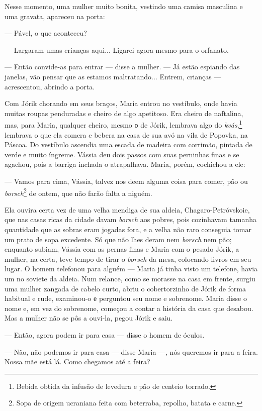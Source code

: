 Nesse momento, uma mulher muito bonita, vestindo uma camisa masculina e
uma gravata, apareceu na porta:

--- Pável, o que aconteceu?

--- Largaram umas crianças aqui... Ligarei agora mesmo para o orfanato.

--- Então convide-as para entrar --- disse a mulher. --- Já estão
espiando das janelas, vão pensar que as estamos maltratando... Entrem,
crianças --- acrescentou, abrindo a porta.

Com Jórik chorando em seus braços, Maria entrou no vestíbulo, onde havia
muitas roupas penduradas e cheiro de algo apetitoso. Era cheiro de
naftalina, mas, para Maria, qualquer cheiro, mesmo о de Jórik, lembrava
algo do \emph{kvás},\footnote{Bebida obtida da infusão de levedura e pão
  de centeio torrado.} lembrava o que ela comera e bebera na casa de sua
avó na vila de Popovka, na Páscoa. Do vestíbulo ascendia uma escada de
madeira com corrimão, pintada de verde e muito íngreme. Vássia deu dois
passos com suas perninhas finas e se agachou, pois a barriga inchada o
atrapalhava. Maria, porém, cochichou a ele:

--- Vamos para cima, Vássia, talvez nos deem alguma coisa para comer,
pão ou \emph{borsch}\footnote{Sopa de origem ucraniana feita com
  beterraba, repolho, batata e carne.} de ontem, que não farão falta a
niguém.

Ela ouvira certa vez de uma velha mendiga de sua aldeia,
Chagaro-Petróvskoie, que nas casas ricas da cidade davam \emph{borsch}
aos pobres, pois cozinhavam tamanha quantidade que as sobras eram
jogadas fora, e a velha não raro conseguia tomar um prato de sopa
excedente. Só que não lhes deram nem \emph{borsch} nem pão; enquanto
subiam, Vássia com as pernas finas e Maria com o pesado Jórik, a mulher,
na certa, teve tempo de tirar o \emph{borsch} da mesa, colocando livros
em seu lugar. O homem telefonou para alguém --- Maria já tinha visto um
telefone, havia um no soviete da aldeia. Num relance, como se morasse na
casa em frente, surgiu uma mulher zangada de cabelo curto, abriu o
cobertorzinho de Jórik de forma habitual e rude, examinou-o е perguntou
seu nome e sobrenome. Maria disse o nome e, em vez do sobrenome, começou
a contar a história da casa que desabou. Mas a mulher não se pôs a
ouvi-la, pegou Jórik e saiu.

--- Então, agora podem ir para casa --- disse o homem de óculos.

--- Não, não podemos ir para casa --- disse Maria ---, nós queremos ir
para a feira. Nossa mãe está lá. Como chegamos até a feira?

